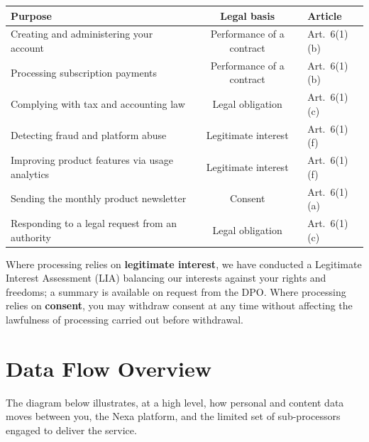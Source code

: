 \documentclass[11pt,a4paper]{scrartcl}
\begin{document}
\begin{tabularx}{\linewidth}{@{}Y c Y@{}}
\toprule
{}
{\color{white}\textbf{Purpose}} & {\color{white}\textbf{Legal basis}} &
  {\color{white}\textbf{Article}} \\
\midrule
Creating and administering your account & Performance of a contract & Art.\ 6(1)(b) \\
Processing subscription payments & Performance of a contract & Art.\ 6(1)(b) \\
Complying with tax and accounting law & Legal obligation & Art.\ 6(1)(c) \\
Detecting fraud and platform abuse & Legitimate interest & Art.\ 6(1)(f) \\
Improving product features via usage analytics & Legitimate interest & Art.\ 6(1)(f) \\
Sending the monthly product newsletter & Consent & Art.\ 6(1)(a) \\
Responding to a legal request from an authority & Legal obligation & Art.\ 6(1)(c) \\
\bottomrule
\end{tabularx}

Where processing relies on \textbf{legitimate interest}, we have conducted a Legitimate
Interest Assessment (LIA) balancing our interests against your rights and freedoms; a summary
is available on request from the DPO. Where processing relies on \textbf{consent}, you may
withdraw consent at any time without affecting the lawfulness of processing carried out before
withdrawal.

\section{Data Flow Overview}

The diagram below illustrates, at a high level, how personal and content data moves between
you, the Nexa platform, and the limited set of sub-processors engaged to deliver the service.
\end{document}
